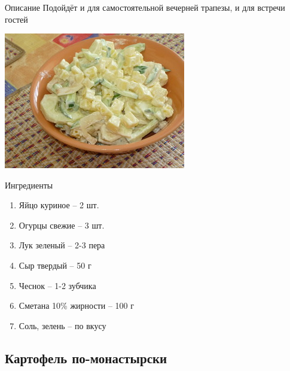 \documentclass[t,hyperref={pdftex,unicode}]{beamer}  %
\begin{document}
\begin{frame} [allowframebreaks]
	\frametitle{\insertsection}
	\framesubtitle{\insertsubsection}
	
	\begin{block}{Описание}
	Подойдёт и для самостоятельной вечерней трапезы, и для встречи гостей
	\begin{center}
	\includegraphics{6_1.jpg}
	\end{center}
	\end{block}
	
	\framebreak
		
	\begin{block}{Ингредиенты}
	\begin{enumerate}
		\item Яйцо куриное – 2 шт.
		\item Огурцы свежие – 3 шт.
		\item Лук зеленый – 2-3 пера
		\item Сыр твердый – 50 г
		\item Чеснок – 1-2 зубчика
		\item Сметана 10\% жирности – 100 г
		\item Соль, зелень – по вкусу
	\end{enumerate}
	\end{block}

\end{frame}

\subsection{Картофель по-монастырски}
\end{document}
